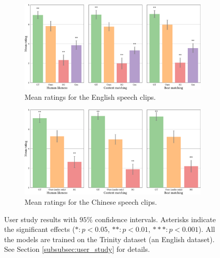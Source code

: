 \begin{figure}[t]
    \centering
    \begin{subfigure}[t]{0.48\textwidth}
        \centering
        \includegraphics[width=\textwidth]{figures/fig8a.pdf}
        \caption{Mean ratings for the English speech clips.}
        \label{fig:fig8a}
    \end{subfigure}
    \hspace{\fill}
    \begin{subfigure}[t]{0.48\textwidth}
        \centering
        \includegraphics[width=\textwidth]{figures/fig8b.pdf}
        \caption{Mean ratings for the Chinese speech clips.}
        \label{fig:fig8b}
    \end{subfigure}
    \caption{User study results with $95\%$ confidence intervals. Asterisks indicate the significant effects ($*: p < 0.05$, $**: p < 0.01$, $***: p < 0.001$). All the models are trained on the Trinity dataset (an English dataset). See Section \ref{subsubsec:user_study} for details.}
    \Description{}
    \label{fig:fig8}
\end{figure}


